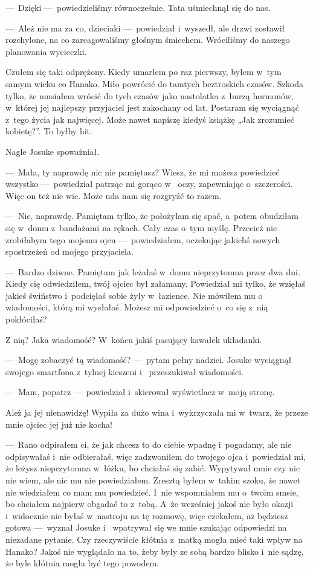 ---~Dzięki ---~powiedzieliśmy równocześnie. Tata uśmiechnął się do nas. 

---~Ależ nie ma za co, dzieciaki ---~powiedział i~wyszedł, ale drzwi zostawił rozchylone, na co zareagowaliśmy 
głośnym śmiechem. Wróciliśmy do naszego planowania wycieczki.

Czułem się taki odprężony. Kiedy umarłem po raz pierwszy, byłem w~tym samym wieku co Hanako. Miło powrócić do tamtych 
beztroskich czasów. Szkoda tylko, że musiałem wrócić do tych czasów jako nastolatka z~burzą hormonów, w~której jej 
najlepszy przyjaciel jest zakochany od lat. Postaram się wyciągnąć z~tego życia jak najwięcej. Może nawet napiszę 
kiedyś książkę „Jak zrozumieć kobietę?”. To byłby hit. 

Nagle Josuke spoważniał. 

---~Mała, ty naprawdę nic nie pamiętasz? Wiesz, że mi możesz powiedzieć wszystko ---~powiedział patrząc mi gorąco w~
oczy, zapewniając o~szczerości. Więc on też nie wie. Może uda nam się rozgryźć to razem.

---~Nie, naprawdę. Pamiętam tylko, że położyłam się spać, a~potem obudziłam się w~domu z~bandażami na rękach. Cały 
czas o~tym myślę. Przecież nie zrobiłabym tego mojemu ojcu ---~powiedziałem, oczekując jakichś nowych spostrzeżeń od 
mojego przyjaciela.

---~Bardzo dziwne. Pamiętam jak leżałaś w~domu nieprzytomna przez dwa dni. Kiedy cię odwiedziłem, twój ojciec był 
załamany. Powiedział mi tylko, że wzięłaś jakieś świństwo i~podcięłaś sobie żyły w~łazience. Nie mówiłem mu o~
wiadomości, którą mi wysłałaś. Możesz mi odpowiedzieć o~co się z~nią pokłóciłaś?

Z nią? Jaka wiadomość? W~końcu jakiś pasujący kawałek układanki. 

---~Mogę zobaczyć tą wiadomość? ---~pytam pełny nadziei. Josuke wyciągnął swojego smartfona z~tylnej kieszeni i~
przeszukiwał wiadomości.

---~Mam, popatrz ---~powiedział i~skierował wyświetlacz w~moją stronę.

\begin{sms}
Ależ ja jej nienawidzę! Wypiła za dużo wina i~wykrzyczała mi w~twarz, że przeze mnie ojciec jej już nie kocha!
\end{sms}

---~Rano odpisałem ci, że jak chcesz to do ciebie wpadnę i~pogadamy, ale nie odpisywałaś i~nie odbierałaś, więc 
zadzwoniłem do twojego ojca i~powiedział mi, że leżysz nieprzytomna w~łóżku, bo chciałaś się zabić. Wypytywał mnie 
czy nic nie wiem, ale nic mu nie powiedziałem. Zresztą byłem w~takim szoku, że nawet nie wiedziałem co mam mu 
powiedzieć. I~nie wspomniałem mu o~twoim smsie, bo chciałem najpierw obgadać to z~tobą. A~że wcześniej jakoś nie było 
okazji i~widocznie nie byłaś w~nastroju na tę rozmowę, więc czekałem, aż będziesz gotowa ---~wyznał Josuke i~
wpatrywał się we mnie szukając odpowiedzi na niezadane pytanie. Czy rzeczywiście kłótnia z~matką mogła mieć taki 
wpływ na Hanako? Jakoś nie wyglądało na to, żeby były ze sobą bardzo blisko i~nie sądzę, że byle kłótnia mogła być 
tego powodem. 

